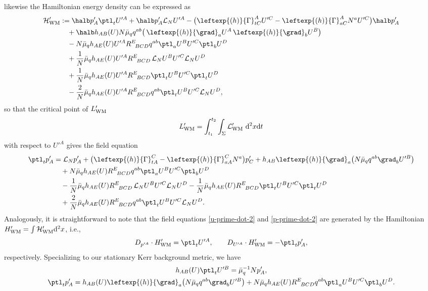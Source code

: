 likewise the Hamiltonian energy density can be expressed as
\begin{align*}
\mathcal{H}'_{{\rm WM}}
& := \halb p'_A \ptl_t U'^A + \halb p'_A \mathcal{L}_N U'^A -\bigl(\leftexp{(h)}{\Gamma}^A_{tC} U'^C - \leftexp{(h)}{\Gamma}^A_{a C} N^a U'^C \bigr)\halb p'_A \notag\\
&\quad{}+\halb h_{AB}(U) N \bar{\mu}_q q^{ab} \bigl(\,\leftexp{(h)}{\grad}_a U^A \, \leftexp{(h)}{\grad}_b U^B \bigr) \notag\\
&\quad{} - N \bar{\mu}_q h_{AE}(U) U'^A R^E_{\,\,\,\,BCD} q^{a b} \ptl_a U^B U'^C \ptl_b U^D \notag\\
&\quad{} +\frac{1}{N} \bar{\mu}_q h_{AE}(U) U'^A R^E_{\,\,\,\,BCD} \, \mathcal{L}_N U^B U'^C \mathcal{L}_N U^D \notag\\
&\quad{} + \frac{1}{N} \bar{\mu}_q h_{AE}(U) U'^A R^E_{\,\,\,\,BCD} \ptl_t U^B U'^C \ptl_t U^D \notag\\
&\quad{} - \frac{2}{N}\bar{\mu}_q h_{AE}(U) U'^A R^E_{\,\,\,\,BCD} q^{a b} \ptl_t U^B U'^C \mathcal{L}_N U^D,
\end{align*}
so that the critical point of $L'_{{\rm WM}}$
\begin{align*}
L'_{{\rm WM}} = \int^{t_2}_{t_1} \int_{\Sigma} \mathcal{L}'_{{\rm WM}} \,\, {\rm d}^2x {\rm d}t
\end{align*}
with respect to $U'^A$ gives the field equation
\begin{align}
\ptl_t p'_A &{}= \mathcal{L}_N p'_A + \bigl(\leftexp{(h)}{\Gamma} ^C_{tA} - \leftexp{(h)}{\Gamma}^C_{aA} N^a\bigr)p'_C + h_{AB} \leftexp{(h)}{\grad}_a \bigl(N \bar{\mu}_q q^{ab} \grad_b U'^B\bigr) \notag\\
&\quad{} + N \bar{\mu}_q h_{AE}(U) R^E_{\,\,\,\,BCD} q^{a b} \ptl_a U^B U'^C \ptl_b U^D \notag\\
&\quad{} -\frac{1}{N} \bar{\mu}_q h_{AE}(U) R^E_{\,\,\,\,BCD} \, \mathcal{L}_N U^B U'^C \mathcal{L}_N U^D
 - \frac{1}{N} \bar{\mu}_q h_{AE}(U) R^E_{\,\,\,\,BCD} \ptl_t U^B U'^C \ptl_t U^D \notag\\
&\quad{} + \frac{2}{N}\bar{\mu}_q h_{AE}(U) R^E_{\,\,\,\,BCD} q^{a b} \ptl_t U^B U'^C \mathcal{L}_N U^D.\label{p-prime-dot-2}
\end{align}
Analogously, it is straightforward to note that the field equations \eqref{u-prime-dot-2} and \eqref{p-prime-dot-2} are generated by the Hamiltonian $H'_{{\rm WM}} = \int \mathcal{H}'_{{\rm WM}} {\rm d}^2 x$, i.e.,
\begin{align*}
D_{p'^A} \cdot H'_{{\rm WM}} = \ptl_t U'^A, \qquad D_{U'^A} \cdot H'_{{\rm WM}} = - \ptl_t p'_A,
\end{align*}
respectively. Specializing to our stationary Kerr background metric, we have
\begin{gather*}
 h_{AB}(U) \ptl_t U'^B= \bar{\mu}^{-1}_q N p'_A, \\
\ptl_t p'_A = h_{AB} (U) \leftexp{(h)}{\grad}_a \bigl(N \bar{\mu}_q q^{ab} \grad_b U'^B\bigr) + N \bar{\mu}_q h_{AE}(U) R^E_{\,\,\,\,BCD} q^{a b} \ptl_a U^B U'^C \ptl_b U^D.
\end{gather*}


